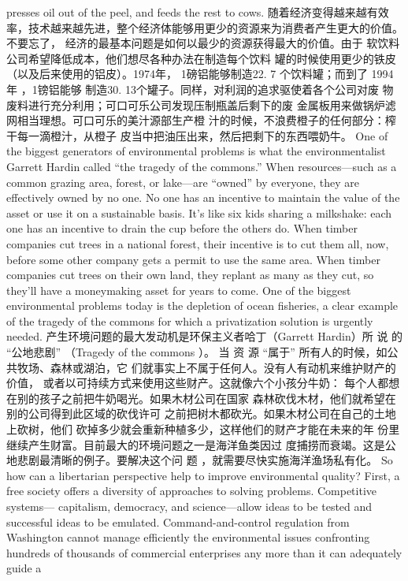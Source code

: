 \begin{paracol}{2}
presses oil out of the peel, and feeds the rest to cows.
\switchcolumn
随着经济变得越来越有效率，技术越来越先进，整个经济体能够用更少的资源来为消费者产生更大的价值。不要忘了，
经济的最基本问题是如何以最少的资源获得最大的价值。由于
软饮料公司希望降低成本，他们想尽各种办法在制造每个饮料
罐的时候使用更少的铁皮（以及后来使用的铝皮）。1974年，
1磅铝能够制造22. 7 个饮料罐；而到了 1994年 ，1镑铝能够
制造30. 13个罐子。同样，对利润的追求驱使着各个公司对废
物废料进行充分利用；可口可乐公司发现压制瓶盖后剩下的废
金属板用来做锅炉滤网相当理想。可口可乐的美汁源部生产橙
汁的时候，不浪费橙子的任何部分：榨干每一滴橙汁，从橙子
皮当中把油压出来，然后把剩下的东西喂奶牛。
\switchcolumn*
One of the biggest generators of environmental problems is
what the environmentalist Garrett Hardin called ``the tragedy
of the commons.'' When resources---such as a common grazing
area, forest, or lake---are ``owned'' by everyone, they are effectively owned by no one. No one has an incentive to maintain
the value of the asset or use it on a sustainable basis. It's like six
kids sharing a milkshake: each one has an incentive to drain the
cup before the others do. When timber companies cut trees in a
national forest, their incentive is to cut them all, now, before
some other company gets a permit to use the same area. When
timber companies cut trees on their own land, they replant as
many as they cut, so they'll have a moneymaking asset for years
to come. One of the biggest environmental problems today is
the depletion of ocean fisheries, a clear example of the tragedy
of the commons for which a privatization solution is urgently
needed.
\switchcolumn
产生环境问题的最大发动机是环保主义者哈丁（Garrett
Hardin）所 说 的 “公地悲剧” （Tragedy  of the commons ）。 当
资 源 “属于” 所有人的时候，如公共牧场、森林或湖泊，它
们就事实上不属于任何人。没有人有动机来维护财产的价值，
或者以可持续方式来使用这些财产。这就像六个小孩分牛奶：
每个人都想在别的孩子之前把牛奶喝光。如果木材公司在国家
森林砍伐木材，他们就希望在别的公司得到此区域的砍伐许可
之前把树木都砍光。如果木材公司在自己的土地上砍树，他们
砍掉多少就会重新种植多少，这样他们的财产才能在未来的年
份里继续产生财富。目前最大的环境问题之一是海洋鱼类因过
度捕捞而衰竭。这是公地悲剧最清晰的例子。要解决这个问
题 ，就需要尽快实施海洋渔场私有化。
\switchcolumn*
So how can a libertarian perspective help to improve environmental quality? First, a free society offers a diversity of approaches  to  solving  problems.  Competitive  systems---
capitalism, democracy, and science---allow ideas to be tested
and successful ideas to be emulated. Command-and-control
regulation from Washington cannot manage efficiently the environmental issues confronting hundreds of thousands of commercial enterprises any more than it can adequately guide a

\end{paracol}
